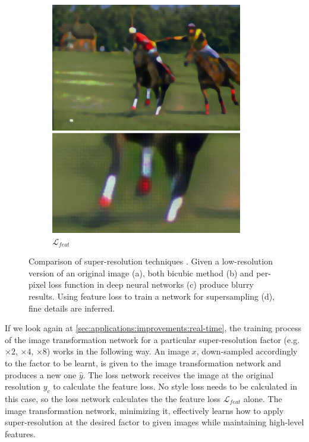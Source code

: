 \begin{figure}[t]
\begin{subfigure}[b]{0.244\textwidth}
    \includegraphics[width=\textwidth]{gfx/app-super-res-4}
    \caption{$\mathcal{L}_{feat}$}
  \end{subfigure}
  \caption{
    Comparison of super-resolution techniques \cite{Johnson2016}.
    Given a low-resolution version of an original image (a), both bicubic method (b) and per-pixel loss function in deep neural networks (c) produce blurry results.
    Using feature loss to train a network for supersampling (d), fine details are inferred.
  }
  \label{sec:applications:uses:super-res}
\end{figure}

If we look again at \autoref{sec:applications:improvements:real-time}, the training process of the image transformation network for a particular super-resolution factor (e.g. $\times{2}$, $\times{4}$, $\times{8}$) works in the following way.
An image $x$, down-sampled accordingly to the factor to be learnt, is given to the image transformation network and produces a new one $\hat{y}$.
The loss network receives the image at the original resolution $y_c$ to calculate the feature loss.
No style loss needs to be calculated in this case, so the loss network calculates the the feature loss $\mathcal{L}_{feat}$ alone.
The image transformation network, minimizing it, effectively learns how to apply super-resolution at the desired factor to given images while maintaining high-level features.


